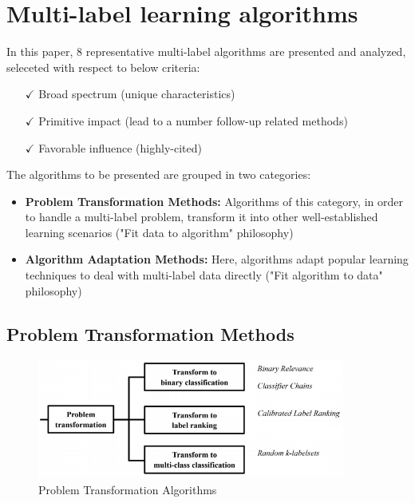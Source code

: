 \documentclass[12pt]{report}
\begin{document}
	\section*{Multi-label learning algorithms}
	In this paper, 8 representative multi-label algorithms are presented and analyzed, seleceted with respect to below criteria:
	\begin{itemize}
		\item[$\checkmark$] Broad spectrum (unique characteristics)
		\item[$\checkmark$] Primitive impact (lead to a number follow-up related methods)
		\item[$\checkmark$] Favorable influence (highly-cited) 
	\end{itemize}
	
	The algorithms to be presented are grouped in two categories:
	\begin{itemize}
		\item \textbf{Problem Transformation Methods: }Algorithms of this category, in order to handle a multi-label problem, transform it into other well-established learning scenarios ("Fit data to algorithm" philosophy)
		\item \textbf{Algorithm Adaptation Methods: }Here, algorithms adapt popular learning techniques to deal with multi-label data directly ("Fit algorithm to data" philosophy)
	\end{itemize}

	\subsection*{Problem Transformation Methods}
	\begin{figure}[H]
		\centering
		\includegraphics[width=0.9\textwidth]{pt.png}
		\caption{Problem Transformation Algorithms}
		\centering
	\end{figure}
\end{document}
